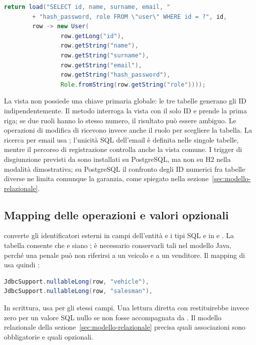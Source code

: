 \begin{lstlisting}[language=Java,caption={Ricostruzione di User da una riga della vista user.},label={lst:user-mapping}]
return load("SELECT id, name, surname, email, "
        + "hash_password, role FROM \"user\" WHERE id = ?", id,
        row -> new User(
                row.getLong("id"),
                row.getString("name"),
                row.getString("surname"),
                row.getString("email"),
                row.getString("hash_password"),
                Role.fromString(row.getString("role"))));
\end{lstlisting}

La vista non possiede una chiave primaria globale: le tre tabelle generano gli ID indipendentemente. Il metodo  interroga la vista con il solo ID e prende la prima riga; se due ruoli hanno lo stesso numero, il risultato può essere ambiguo. Le operazioni di modifica di  ricevono invece anche il ruolo per scegliere la tabella. La ricerca per email usa ; l'unicità SQL dell'email è definita nelle singole tabelle, mentre il percorso di registrazione controlla anche la vista comune. I trigger di disgiunzione previsti da  sono installati su PostgreSQL, ma non su H2 nella modalità dimostrativa; su PostgreSQL il confronto degli ID numerici fra tabelle diverse ne limita comunque la garanzia, come spiegato nella sezione~\ref{sec:modello-relazionale}.

\subsection{Mapping delle operazioni e valori opzionali}
 converte gli identificatori esterni in campi dell'entità e i tipi SQL  e  in  e . La tabella  consente che  e  siano ; è necessario conservarli tali nel modello Java, perché una penale può non riferirsi a un veicolo e a un venditore. Il mapping di  usa quindi :

\begin{lstlisting}[language=Java,caption={Lettura delle due chiavi opzionali nel mapping di Sale.},label={lst:sale-mapping}]
JdbcSupport.nullableLong(row, "vehicle"),
JdbcSupport.nullableLong(row, "salesman"),
\end{lstlisting}

In scrittura,  usa  per gli stessi campi. Una lettura diretta con  restituirebbe invece zero per un valore SQL nullo se non fosse accompagnata da . Il modello relazionale della sezione~\ref{sec:modello-relazionale} precisa quali associazioni sono obbligatorie e quali opzionali.

